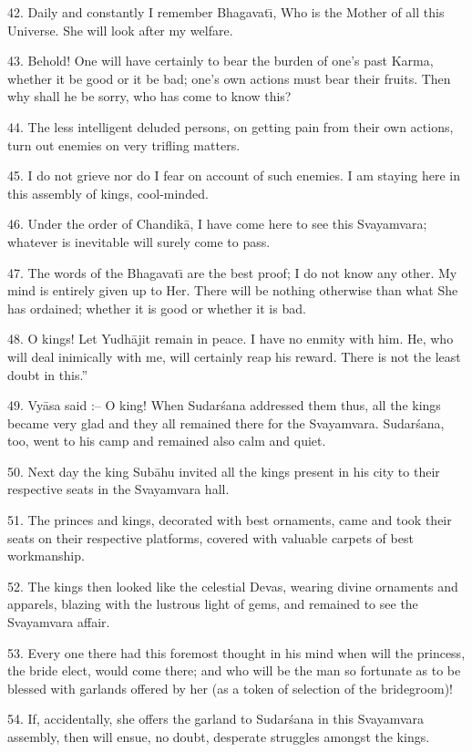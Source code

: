 42. Daily and constantly I remember Bhagavat\={\i}, Who is the Mother of all this Universe. She will look after my welfare.

43. Behold! One will have certainly to bear the burden of one's past Karma, whether it be good or it be bad; one's own actions must bear their fruits. Then why shall he be sorry, who has come to know this?

44. The less intelligent deluded persons, on getting pain from their own actions, turn out enemies on very trifling matters.

45. I do not grieve nor do I fear on account of such enemies. I am staying here in this assembly of kings, cool-minded.

46. Under the order of Chandik\=a, I have come here to see this Svayamvara; whatever is inevitable will surely come to pass.

47. The words of the Bhagavat\={\i} are the best proof; I do not know any other. My mind is entirely given up to Her. There will be nothing otherwise than what She has ordained; whether it is good or whether it is bad.

48. O kings! Let Yudh\=ajit remain in peace. I have no enmity with him. He, who will deal inimically with me, will certainly reap his reward. There is not the least doubt in this.''

49. Vy\=asa said :-- O king! When Sudar\'sana addressed them thus, all the kings became very glad and they all remained there for the Svayamvara. Sudar\'sana, too, went to his camp and remained also calm and quiet.

50. Next day the king Sub\=ahu invited all the kings present in his city to their respective seats in the Svayamvara hall.

51. The princes and kings, decorated with best ornaments, came and took their seats on their respective platforms, covered with valuable carpets of best workmanship.

52. The kings then looked like the celestial Devas, wearing divine ornaments and apparels, blazing with the lustrous light of gems, and remained to see the Svayamvara affair.

53. Every one there had this foremost thought in his mind when will the princess, the bride elect, would come there; and who will be the man so fortunate as to be blessed with garlands offered by her (as a token of selection of the bridegroom)!

54. If, accidentally, she offers the garland to Sudar\'sana in this Svayamvara assembly, then will ensue, no doubt, desperate struggles amongst the kings.

